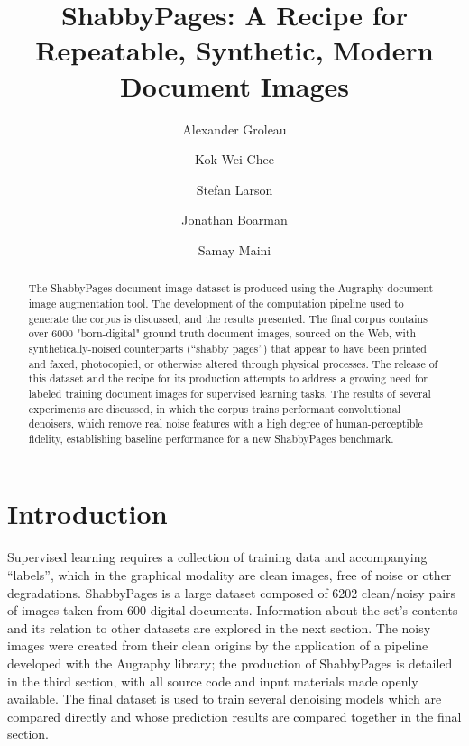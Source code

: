 \documentclass[runningheads]{llncs}
\begin{document}
\title{ShabbyPages: A Recipe for Repeatable, Synthetic, Modern Document Images}
\author{Alexander Groleau \and
  Kok Wei Chee \and
  Stefan Larson \and
  Jonathan Boarman \and
  Samay Maini}



\maketitle

\begin{abstract}
The ShabbyPages document image dataset is produced using the Augraphy document image augmentation tool. The development of the computation pipeline used to generate the corpus is discussed, and the results presented. The final corpus contains over 6000 "born-digital" ground truth document images, sourced on the Web, with synthetically-noised counterparts (``shabby pages'') that appear to have been printed and faxed, photocopied, or otherwise altered through physical processes. The release of this dataset and the recipe for its production attempts to address a growing need for labeled training document images for supervised learning tasks. The results of several experiments are discussed, in which the corpus trains performant convolutional denoisers, which remove real noise features with a high degree of human-perceptible fidelity, establishing baseline performance for a new ShabbyPages benchmark.
\end{abstract}

\section{Introduction}
Supervised learning requires a collection of training data and accompanying ``labels'', which in the graphical modality are clean images, free of noise or other degradations. ShabbyPages is a large dataset composed of 6202 clean/noisy pairs of images taken from 600 digital documents. Information about the set's contents and its relation to other datasets are explored in the next section. The noisy images were created from their clean origins by the application of a pipeline developed with the Augraphy library; the production of ShabbyPages is detailed in the third section, with all source code and input materials made openly available. The final dataset is used to train several denoising models which are compared directly and whose prediction results are compared together in the final section.
\end{document}

